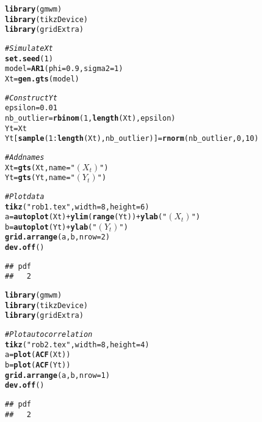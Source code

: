 \documentclass{article}\usepackage[]{graphicx}\usepackage[]{color}
\makeatletter
\newcommand{\hlnum}[1]{\textcolor[rgb]{0.686,0.059,0.569}{#1}}%
\newcommand{\hlstr}[1]{\textcolor[rgb]{0.192,0.494,0.8}{#1}}%
\newcommand{\hlcom}[1]{\textcolor[rgb]{0.678,0.584,0.686}{\textit{#1}}}%
\newcommand{\hlopt}[1]{\textcolor[rgb]{0,0,0}{#1}}%
\newcommand{\hlstd}[1]{\textcolor[rgb]{0.345,0.345,0.345}{#1}}%
\newcommand{\hlkwb}[1]{\textcolor[rgb]{0.69,0.353,0.396}{#1}}%
\newcommand{\hlkwc}[1]{\textcolor[rgb]{0.333,0.667,0.333}{#1}}%
\newcommand{\hlkwd}[1]{\textcolor[rgb]{0.737,0.353,0.396}{\textbf{#1}}}%
\newenvironment{kframe}{%
 \def\at@end@of@kframe{}%
 \ifinner\ifhmode%
  \def\at@end@of@kframe{\end{minipage}}%
  \begin{minipage}{\columnwidth}%
 \fi\fi%
 \def\FrameCommand##1{\hskip\@totalleftmargin \hskip-\fboxsep
 \colorbox{shadecolor}{##1}\hskip-\fboxsep
     \hskip-\linewidth \hskip-\@totalleftmargin \hskip\columnwidth}%
 \MakeFramed {\advance\hsize-\width
   \@totalleftmargin\z@ \linewidth\hsize
   \@setminipage}}%
 {\par\unskip\endMakeFramed%
 \at@end@of@kframe}
\newenvironment{knitrout}{}{} %
\makeatother
\begin{document}
\begin{knitrout}
\color{fgcolor}\begin{kframe}
\begin{alltt}
\hlkwd{library}\hlstd{(gmwm)}
\hlkwd{library}\hlstd{(tikzDevice)}
\hlkwd{library}\hlstd{(gridExtra)}

\hlcom{# Simulate Xt}
\hlkwd{set.seed}\hlstd{(}\hlnum{1}\hlstd{)}
\hlstd{model} \hlkwb{=} \hlkwd{AR1}\hlstd{(}\hlkwc{phi} \hlstd{=} \hlnum{0.9}\hlstd{,} \hlkwc{sigma2} \hlstd{=} \hlnum{1}\hlstd{)}
\hlstd{Xt} \hlkwb{=} \hlkwd{gen.gts}\hlstd{(model)}

\hlcom{# Construct Yt}
\hlstd{epsilon} \hlkwb{=} \hlnum{0.01}
\hlstd{nb_outlier} \hlkwb{=} \hlkwd{rbinom}\hlstd{(}\hlnum{1}\hlstd{,}\hlkwd{length}\hlstd{(Xt),epsilon)}
\hlstd{Yt} \hlkwb{=} \hlstd{Xt}
\hlstd{Yt[}\hlkwd{sample}\hlstd{(}\hlnum{1}\hlopt{:}\hlkwd{length}\hlstd{(Xt),nb_outlier)]} \hlkwb{=} \hlkwd{rnorm}\hlstd{(nb_outlier,}\hlnum{0}\hlstd{,}\hlnum{10}\hlstd{)}

\hlcom{# Add names}
\hlstd{Xt} \hlkwb{=} \hlkwd{gts}\hlstd{(Xt,} \hlkwc{name} \hlstd{=} \hlstr{"$(X_t)$"}\hlstd{)}
\hlstd{Yt} \hlkwb{=} \hlkwd{gts}\hlstd{(Yt,} \hlkwc{name} \hlstd{=} \hlstr{"$(Y_t)$"}\hlstd{)}

\hlcom{# Plot data}
\hlkwd{tikz}\hlstd{(}\hlstr{"rob1.tex"}\hlstd{,} \hlkwc{width} \hlstd{=} \hlnum{8}\hlstd{,} \hlkwc{height} \hlstd{=} \hlnum{6}\hlstd{)}
\hlstd{a} \hlkwb{=} \hlkwd{autoplot}\hlstd{(Xt)} \hlopt{+} \hlkwd{ylim}\hlstd{(}\hlkwd{range}\hlstd{(Yt))} \hlopt{+} \hlkwd{ylab}\hlstd{(}\hlstr{"$(X_t)$"}\hlstd{)}
\hlstd{b} \hlkwb{=} \hlkwd{autoplot}\hlstd{(Yt)} \hlopt{+} \hlkwd{ylab}\hlstd{(}\hlstr{"$(Y_t)$"}\hlstd{)}
\hlkwd{grid.arrange}\hlstd{(a, b,} \hlkwc{nrow} \hlstd{=} \hlnum{2}\hlstd{)}
\hlkwd{dev.off}\hlstd{()}
\end{alltt}
\begin{verbatim}
## pdf 
##   2
\end{verbatim}
\end{kframe}
\end{knitrout}

\begin{knitrout}
\color{fgcolor}\begin{kframe}
\begin{alltt}
\hlkwd{library}\hlstd{(gmwm)}
\hlkwd{library}\hlstd{(tikzDevice)}
\hlkwd{library}\hlstd{(gridExtra)}

\hlcom{# Plot autocorrelation}
\hlkwd{tikz}\hlstd{(}\hlstr{"rob2.tex"}\hlstd{,} \hlkwc{width} \hlstd{=} \hlnum{8}\hlstd{,} \hlkwc{height} \hlstd{=} \hlnum{4}\hlstd{)}
\hlstd{a} \hlkwb{=} \hlkwd{plot}\hlstd{(}\hlkwd{ACF}\hlstd{(Xt))}
\hlstd{b} \hlkwb{=} \hlkwd{plot}\hlstd{(}\hlkwd{ACF}\hlstd{(Yt))}
\hlkwd{grid.arrange}\hlstd{(a, b,} \hlkwc{nrow} \hlstd{=} \hlnum{1}\hlstd{)}
\hlkwd{dev.off}\hlstd{()}
\end{alltt}
\begin{verbatim}
## pdf 
##   2
\end{verbatim}
\end{kframe}
\end{knitrout}
\end{document}
